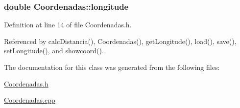 \hypertarget{class_coordenadas_a328c0d572b3a7d47bfbd866f5d6d6489}{
\subsubsection[{longitude}]{\setlength{\rightskip}{0pt plus 5cm}double Coordenadas\+::longitude\hspace{0.3cm}{\ttfamily [private]}}}\label{class_coordenadas_a328c0d572b3a7d47bfbd866f5d6d6489}


Definition at line 14 of file Coordenadas.\+h.



Referenced by calc\+Distancia(), Coordenadas(), get\+Longitude(), load(), save(), set\+Longitude(), and showcoord().



The documentation for this class was generated from the following files\+:\begin{DoxyCompactItemize}
\item 
\hyperlink{_coordenadas_8h}{Coordenadas.\+h}\item 
\hyperlink{_coordenadas_8cpp}{Coordenadas.\+cpp}\end{DoxyCompactItemize}
